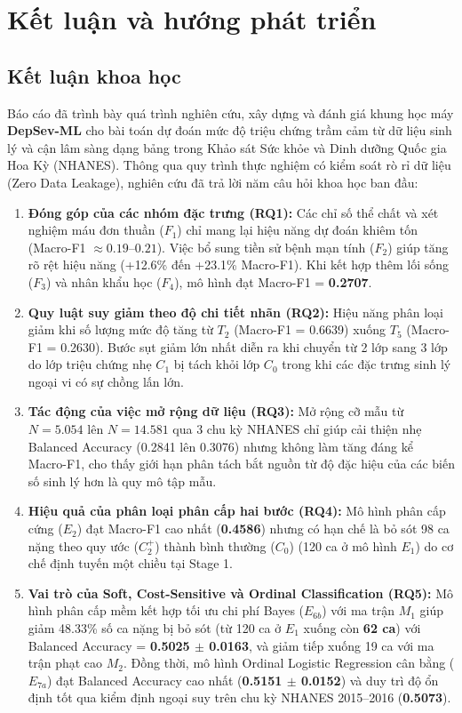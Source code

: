 \chapter{Kết luận và hướng phát triển}
\label{ch:ket-luan}

\section{Kết luận khoa học}
\label{sec:ket-luan-khoa-hoc}

Báo cáo đã trình bày quá trình nghiên cứu, xây dựng và đánh giá khung học máy \textbf{DepSev-ML} cho bài toán dự đoán mức độ triệu chứng trầm cảm từ dữ liệu sinh lý và cận lâm sàng dạng bảng trong Khảo sát Sức khỏe và Dinh dưỡng Quốc gia Hoa Kỳ (NHANES). Thông qua quy trình thực nghiệm có kiểm soát rò rỉ dữ liệu (Zero Data Leakage), nghiên cứu đã trả lời năm câu hỏi khoa học ban đầu:

\begin{enumerate}
    \item \textbf{Đóng góp của các nhóm đặc trưng (RQ1):} Các chỉ số thể chất và xét nghiệm máu đơn thuần ($F_1$) chỉ mang lại hiệu năng dự đoán khiêm tốn (Macro-F1 $\approx 0.19$--$0.21$). Việc bổ sung tiền sử bệnh mạn tính ($F_2$) giúp tăng rõ rệt hiệu năng (+12.6\% đến +23.1\% Macro-F1). Khi kết hợp thêm lối sống ($F_3$) và nhân khẩu học ($F_4$), mô hình đạt Macro-F1 = \textbf{0.2707}.
    \item \textbf{Quy luật suy giảm theo độ chi tiết nhãn (RQ2):} Hiệu năng phân loại giảm khi số lượng mức độ tăng từ $T_2$ (Macro-F1 = 0.6639) xuống $T_5$ (Macro-F1 = 0.2630). Bước sụt giảm lớn nhất diễn ra khi chuyển từ 2 lớp sang 3 lớp do lớp triệu chứng nhẹ $C_1$ bị tách khỏi lớp $C_0$ trong khi các đặc trưng sinh lý ngoại vi có sự chồng lấn lớn.
    \item \textbf{Tác động của việc mở rộng dữ liệu (RQ3):} Mở rộng cỡ mẫu từ $N = 5.054$ lên $N = 14.581$ qua 3 chu kỳ NHANES chỉ giúp cải thiện nhẹ Balanced Accuracy (0.2841 lên 0.3076) nhưng không làm tăng đáng kể Macro-F1, cho thấy giới hạn phân tách bắt nguồn từ độ đặc hiệu của các biến số sinh lý hơn là quy mô tập mẫu.
    \item \textbf{Hiệu quả của phân loại phân cấp hai bước (RQ4):} Mô hình phân cấp cứng ($E_2$) đạt Macro-F1 cao nhất (\textbf{0.4586}) nhưng có hạn chế là bỏ sót 98 ca nặng theo quy ước ($C_2^+$) thành bình thường ($C_0$) (120 ca ở mô hình $E_1$) do cơ chế định tuyến một chiều tại Stage 1.
    \item \textbf{Vai trò của Soft, Cost-Sensitive và Ordinal Classification (RQ5):} Mô hình phân cấp mềm kết hợp tối ưu chi phí Bayes ($E_{6b}$) với ma trận $M_1$ giúp giảm 48.33\% số ca nặng bị bỏ sót (từ 120 ca ở $E_1$ xuống còn \textbf{62 ca}) với Balanced Accuracy = \textbf{0.5025 $\pm$ 0.0163}, và giảm tiếp xuống 19 ca với ma trận phạt cao $M_2$. Đồng thời, mô hình Ordinal Logistic Regression cân bằng ($E_{7a}$) đạt Balanced Accuracy cao nhất (\textbf{0.5151 $\pm$ 0.0152}) và duy trì độ ổn định tốt qua kiểm định ngoại suy trên chu kỳ NHANES 2015--2016 (\textbf{0.5073}).
\end{enumerate}

